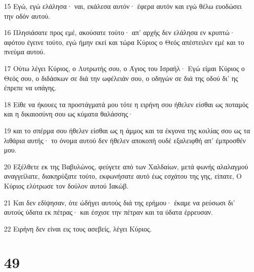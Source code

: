 \par 15 Εγώ, εγώ ελάλησα· ναι, εκάλεσα αυτόν· έφερα αυτόν και εγώ θέλω ευοδώσει την οδόν αυτού.
\par 16 Πλησιάσατε προς εμέ, ακούσατε τούτο· απ' αρχής δεν ελάλησα εν κρυπτώ· αφότου έγεινε τούτο, εγώ ήμην εκεί και τώρα Κύριος ο Θεός απέστειλεν εμέ και το πνεύμα αυτού.
\par 17 Ούτω λέγει Κύριος, ο Λυτρωτής σου, ο Άγιος του Ισραήλ· Εγώ είμαι Κύριος ο Θεός σου, ο διδάσκων σε διά την ωφέλειάν σου, ο οδηγών σε διά της οδού δι' ης έπρεπε να υπάγης.
\par 18 Είθε να ήκουες τα προστάγματά μου τότε η ειρήνη σου ήθελεν είσθαι ως ποταμός και η δικαιοσύνη σου ως κύματα θαλάσσης·
\par 19 και το σπέρμα σου ήθελεν είσθαι ως η άμμος και τα έκγονα της κοιλίας σου ως τα λιθάρια αυτής· το όνομα αυτού δεν ήθελεν αποκοπή ουδέ εξαλειφθή απ' έμπροσθέν μου.
\par 20 Εξέλθετε εκ της Βαβυλώνος, φεύγετε από των Χαλδαίων, μετά φωνής αλαλαγμού αναγγείλατε, διακηρύξατε τούτο, εκφωνήσατε αυτό έως εσχάτου της γης, είπατε, Ο Κύριος ελύτρωσε τον δούλον αυτού Ιακώβ.
\par 21 Και δεν εδίψησαν, ότε ώδήγει αυτούς διά της ερήμου· έκαμε να ρεύσωσι δι' αυτούς ύδατα εκ πέτρας· και έσχισε την πέτραν και τα ύδατα έρρευσαν.
\par 22 Ειρήνη δεν είναι εις τους ασεβείς, λέγει Κύριος.

\chapter{49}

